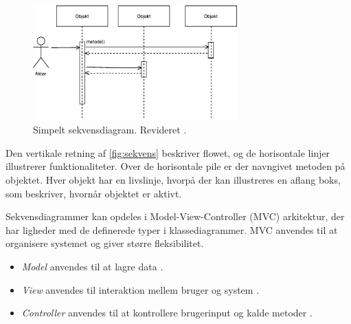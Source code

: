 \begin{figure} [H]
\centering
\includegraphics[width=0.7\textwidth]{figures/sekvens}
\caption{Simpelt sekvensdiagram. Revideret \cite{Brahma2015}.}
\label{fig:sekvens}
\end{figure}

\noindent
Den vertikale retning af \autoref{fig:sekvens} beskriver flowet, og de horisontale linjer illustrerer funktionaliteter. Over de horisontale pile er der navngivet metoden på objektet. Hver objekt har en livslinje, hvorpå der kan illustreres en aflang boks, som beskriver, hvornår objektet er aktivt.\cite{Brahma2015}

Sekvensdiagrammer kan opdeles i Model-View-Controller (MVC) arkitektur, der har ligheder med de definerede typer i klassediagrammer. MVC anvendes til at organisere systemet og giver større fleksibilitet.\cite{Brahma2015}

\begin{itemize}
\item \textit{Model} anvendes til at lagre data \cite{Brahma2015}.
\item \textit{View} anvendes til interaktion mellem bruger og system \cite{Brahma2015}.
\item \textit{Controller} anvendes til at kontrollere brugerinput og kalde metoder \cite{Brahma2015}.
\end{itemize}